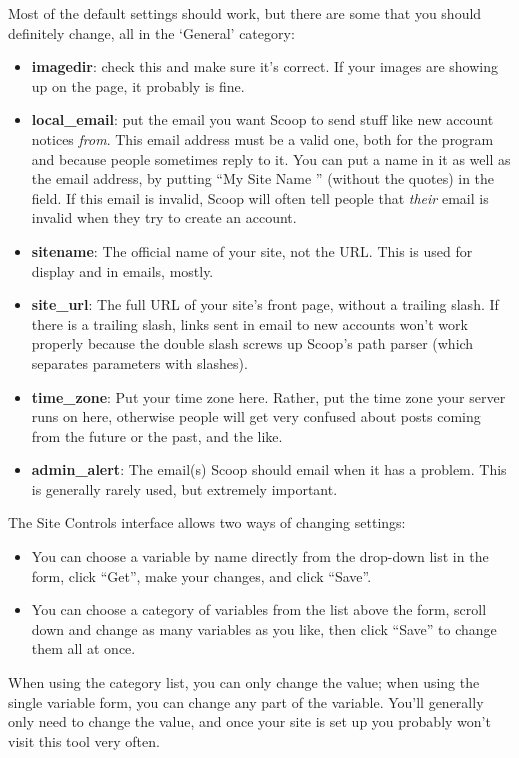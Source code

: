 Most of the default settings should work, but there are some that you should definitely change, all in the `General' category:
\begin{itemize}
\item {\bf imagedir}: check this and make sure it's correct.  If your images are showing up on the page, it probably is fine.
\item {\bf local\_email}: put the email you want Scoop to send stuff like new account notices {\em from}.  This email address must be a valid one, both for the program and because people sometimes reply to it.  You can put a name in it as well as the email address, by putting ``My Site Name '' (without the quotes) in the field.  If this email is invalid, Scoop will often tell people that {\em their} email is invalid when they try to create an account.
\item {\bf sitename}: The official name of your site, not the URL.  This is used for display and in emails, mostly.
\item {\bf site\_url}: The full URL of your site's front page, without a trailing slash.  If there is a trailing slash, links sent in email to new accounts won't work properly because the double slash screws up Scoop's path parser (which separates parameters with slashes).
\item {\bf time\_zone}: Put your time zone here.  Rather, put the time zone your server runs on here, otherwise people will get very confused about posts coming from the future or the past, and the like.
\item {\bf admin\_alert}: The email(s) Scoop should email when it has a problem.  This is generally rarely used, but extremely important.
\end{itemize}

The Site Controls interface allows two ways of changing settings:
\begin{itemize}
\item You can choose a variable by name directly from the drop-down list in the form, click ``Get'', make your changes, and click ``Save''.  
\item You can choose a category of variables from the list above the form, scroll down and change as many variables as you like, then click ``Save'' to change them all at once.  
\end{itemize}

When using the category list, you can only change the value; when using the single variable form, you can change any part of the variable.  You'll generally only need to change the value, and once your site is set up you probably won't visit this tool very often.

